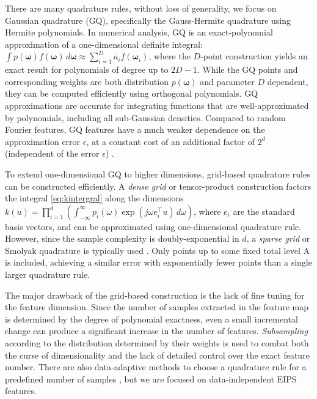 \documentclass[8pt,twocolumn]{IEEEtran}
\begin{document}
There are many quadrature rules, without loss of generality, we focus on Gaussian quadrature (GQ), specifically the Gauss-Hermite quadrature using Hermite polynomials. In numerical analysis, GQ is an exact-polynomial approximation of a one-dimensional definite integral:  $\int p(\bm{\omega}) f(\bm{\omega}) \, d \bm{\omega} \approx \sum_{i=1}^D a_i f(\bm{\omega}_i)$, where the $D$-point construction yields an exact result for polynomials of degree up to $2D - 1$. While the GQ points and corresponding weights are both distribution $p(\bm{\omega})$ and parameter $D$ dependent, they can be computed efficiently using orthogonal polynomials. GQ approximations are accurate for integrating functions that are well-approximated by polynomials, including all sub-Gaussian densities. Compared to random Fourier features, GQ features have a much weaker dependence on the approximation error $\epsilon$, at a constant cost of an additional factor of $2^d$ (independent of the error $\epsilon$) \cite{Dao2017}.

To extend one-dimensional GQ to higher dimensions, grid-based quadrature rules can be constructed efficiently. A \emph{dense grid} or tensor-product construction factors the integral \eqref{eq:kintergral} along the dimensions
$k(u) = \prod_{i=1}^d \left(\int_{-\infty}^{\infty} p_i(\omega)
\exp(j \omega e_i^\intercal u) \, d \omega \right)$, where $e_i$ are the standard basis vectors, and can be approximated using one-dimensional quadrature rule. However, since the sample complexity is doubly-exponential in $d$, a \emph{sparse grid} or Smolyak quadrature is typically used \cite{Smolyak63}. Only points up to some fixed total level A is included, achieving a similar error with exponentially fewer points than a single larger quadrature rule. 

The major drawback of the grid-based construction is the lack of fine tuning for the feature dimension. Since the number of samples extracted in the feature map is determined by the degree of polynomial exactness, even a small incremental change can produce a significant increase in the number of features. \emph{Subsampling} according to the distribution determined by their weights is used to combat both the curse of dimensionality and the lack of detailed control over the exact feature number. There are also data-adaptive methods to choose a quadrature rule for a predefined number of samples \cite{Dao2017}, but we are focused on data-independent EIPS features.
\end{document}
